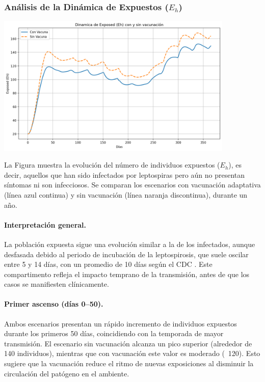 \documentclass[12pt,a4paper]{article}
\begin{document}
\subsubsection{Análisis de la Dinámica de Expuestos (\texorpdfstring{$E_h$}{Eh})}

\includegraphics[width=0.85\textwidth]{Images/expuestos.png}


La Figura muestra la evolución del número de individuos expuestos ($E_h$), es decir, aquellos que han sido infectados por leptospiras pero aún no presentan síntomas ni son infecciosos. Se comparan los escenarios con vacunación adaptativa (línea azul continua) y sin vacunación (línea naranja discontinua), durante un año.


\paragraph{Interpretación general.} La población expuesta sigue una evolución similar a la de los infectados, aunque desfasada debido al periodo de incubación de la leptospirosis, que suele oscilar entre 5 y 14 días, con un promedio de 10 días según el CDC \cite{cdc2024}. Este compartimento refleja el impacto temprano de la transmisión, antes de que los casos se manifiesten clínicamente.

\paragraph{Primer ascenso (días 0–50).} Ambos escenarios presentan un rápido incremento de individuos expuestos durante los primeros 50 días, coincidiendo con la temporada de mayor transmisión. El escenario sin vacunación alcanza un pico superior (alrededor de 140 individuos), mientras que con vacunación este valor es moderado (~120). Esto sugiere que la vacunación reduce el ritmo de nuevas exposiciones al disminuir la circulación del patógeno en el ambiente.
\end{document}

